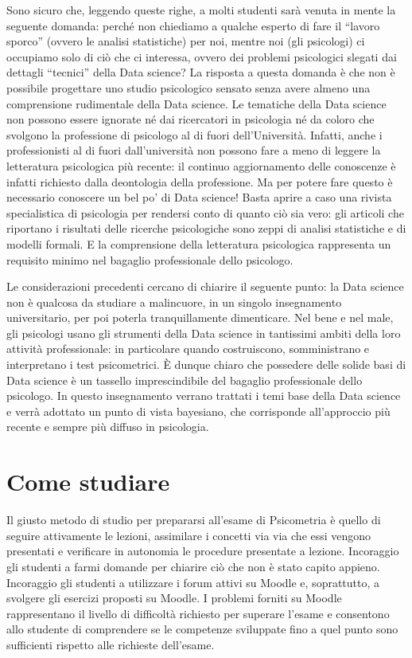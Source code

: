 \documentclass[
  11pt,
]{krantz}
\theoremstyle{definition}
\theoremstyle{definition}
\theoremstyle{definition}
\theoremstyle{definition}
\theoremstyle{remark}
\begin{document}
Sono sicuro che, leggendo queste righe, a molti studenti sarà venuta in mente la seguente domanda: perché non chiediamo a qualche esperto di fare il ``lavoro sporco'' (ovvero le analisi statistiche) per noi, mentre noi (gli psicologi) ci occupiamo solo di ciò che ci interessa, ovvero dei problemi psicologici slegati dai dettagli ``tecnici'' della Data science? La risposta a questa domanda è che non è possibile progettare uno studio psicologico sensato senza avere almeno una comprensione rudimentale della Data science. Le tematiche della Data science non possono essere ignorate né dai ricercatori in psicologia né da coloro che svolgono la professione di psicologo al di fuori dell'Università. Infatti, anche i professionisti al di fuori dall'università non possono fare a meno di leggere la letteratura psicologica più recente: il continuo aggiornamento delle conoscenze è infatti richiesto dalla deontologia della professione. Ma per potere fare questo è necessario conoscere un bel po' di Data science! Basta aprire a caso una rivista specialistica di psicologia per rendersi conto di quanto ciò sia vero: gli articoli che riportano i risultati delle ricerche psicologiche sono zeppi di analisi statistiche e di modelli formali. E la comprensione della letteratura psicologica rappresenta un requisito minimo nel bagaglio professionale dello psicologo.

Le considerazioni precedenti cercano di chiarire il seguente punto: la Data science non è qualcosa da studiare a malincuore, in un singolo insegnamento universitario, per poi poterla tranquillamente dimenticare. Nel bene e nel male, gli psicologi usano gli strumenti della Data science in tantissimi ambiti della loro attività professionale: in particolare quando costruiscono, somministrano e interpretano i test psicometrici. È dunque chiaro che possedere delle solide basi di Data science è un tassello imprescindibile del bagaglio professionale dello psicologo. In questo insegnamento verrano trattati i temi base della Data science e verrà adottato un punto di vista bayesiano, che corrisponde all'approccio più recente e sempre più diffuso in psicologia.

\hypertarget{come-studiare}{%
\section*{Come studiare}\label{come-studiare}}


Il giusto metodo di studio per prepararsi all'esame di Psicometria è quello di seguire attivamente le lezioni, assimilare i concetti via via che essi vengono presentati e verificare in autonomia le procedure presentate a lezione. Incoraggio gli studenti a farmi domande per chiarire ciò che non è stato capito appieno. Incoraggio gli studenti a utilizzare i forum attivi su Moodle e, soprattutto, a svolgere gli esercizi proposti su Moodle. I problemi forniti su Moodle rappresentano il livello di difficoltà richiesto per superare l'esame e consentono allo studente di comprendere se le competenze sviluppate fino a quel punto sono sufficienti rispetto alle richieste dell'esame.
\end{document}
